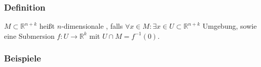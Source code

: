 \subsubsection[Definition: Untermannigfaltigkeit]{Definition} %
\label{ssub:116}
$M \subset \mathds{R}^{n+k}$ heißt $n$-dimensionale , falls $\forall x \in M : \exists x \in U \subset \mathds{R}^{n+k}$ Umgebung, sowie eine
Submersion $f : U \to \mathds{R}^k$ mit $U \cap M = f ^{-1}(0)$. 

\subsubsection[Beispiele für Untermannigfaltigkeiten]{Beispiele} %
\label{ssub:117}
